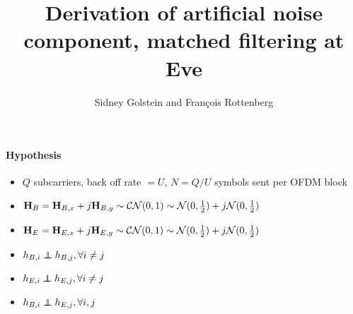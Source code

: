 \documentclass[12pt]{article}
\begin{document}
\title{\textbf{Derivation of artificial noise component, matched filtering at Eve}}
\author{Sidney Golstein and Fran\c cois Rottenberg}
\maketitle


\paragraph*{Hypothesis}
\begin{itemize}
	\item $Q$ subcarriers, back off rate $= U$, $N = Q/U$ symbols sent per OFDM block
	\item  $\boldsymbol{\mathrm{H}}_B = \boldsymbol{\mathrm{H}}_{B,x} + j\boldsymbol{\mathrm{H}}_{B,y} \sim \mathcal{CN}(0,1) \sim \mathcal{N}(0,\frac{1}{2}) + j \mathcal{N}(0,\frac{1}{2}) $
	\item  $\boldsymbol{\mathrm{H}}_E = \boldsymbol{\mathrm{H}}_{E,x} + j\boldsymbol{\mathrm{H}}_{E,y} \sim \mathcal{CN}(0,1) \sim \mathcal{N}(0,\frac{1}{2}) + j \mathcal{N}(0,\frac{1}{2}) $
	\item $h_{B,i} \indep h_{B,j}, \forall i \neq j$
	\item $h_{E,i} \indep h_{E,j}, \forall i \neq j$
	\item $h_{B,i} \indep h_{E,j}, \forall i,j$
\end{itemize}
\end{document}
